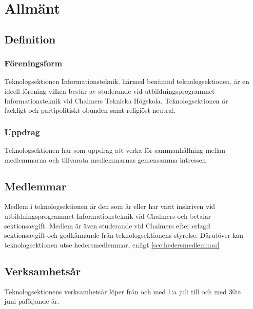\section{Allmänt}

\subsection{Definition}

\subsubsection{Föreningsform}
Teknologsektionen Informationsteknik, härmed benämnd teknologsektionen, är en ideell förening vilken består av studerande vid utbildningsprogrammet Informationsteknik vid Chalmers Tekniska Högskola. Teknologsektionen är fackligt och partipolitiskt obunden samt religiöst neutral.

\subsubsection{Uppdrag}
Teknologsektionen har som uppdrag att verka för sammanhållning mellan medlemmarna och tillvarata medlemmarnas gemensamma intressen.

\subsection{Medlemmar}

Medlem i teknologsektionen är den som är eller har varit inskriven vid utbildningsprogrammet Informationsteknik vid Chalmers och betalar sektionsavgift. Medlem är även studerande vid Chalmers efter erlagd sektionsavgift och godkännande från teknologsektionens styrelse. Därutöver kan teknologsektionen utse hedersmedlemmar, enligt \ref{sec:hedersmedlemmar}

\subsection{Verksamhetsår}
Teknologsektionens verksamhetsår löper från och med 1:a juli till och med 30:e juni påföljande år.